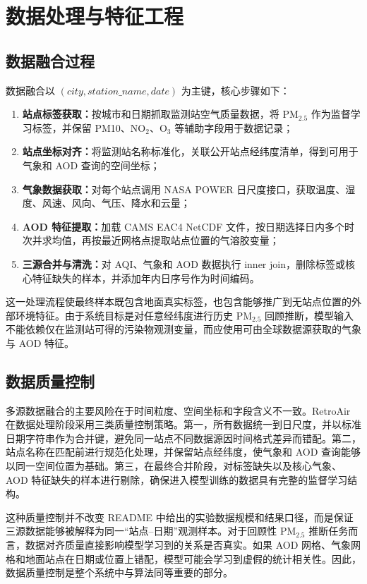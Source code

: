 \documentclass[UTF8,zihao=-4,a4paper]{ctexart}
\newcommand{\pmfine}{PM$_{2.5}$}
\newcommand{\aod}{AOD}
\begin{document}
\section{数据处理与特征工程}

\subsection{数据融合过程}

数据融合以 $(city, station\_name, date)$ 为主键，核心步骤如下：

\begin{enumerate}
  \item \textbf{站点标签获取：}按城市和日期抓取监测站空气质量数据，将 \pmfine{} 作为监督学习标签，并保留 PM10、NO$_2$、O$_3$ 等辅助字段用于数据记录；
  \item \textbf{站点坐标对齐：}将监测站名称标准化，关联公开站点经纬度清单，得到可用于气象和 \aod{} 查询的空间坐标；
  \item \textbf{气象数据获取：}对每个站点调用 NASA POWER 日尺度接口，获取温度、湿度、风速、风向、气压、降水和云量；
  \item \textbf{\aod{} 特征提取：}加载 CAMS EAC4 NetCDF 文件，按日期选择日内多个时次并求均值，再按最近网格点提取站点位置的气溶胶变量；
  \item \textbf{三源合并与清洗：}对 AQI、气象和 \aod{} 数据执行 inner join，删除标签或核心特征缺失的样本，并添加年内日序号作为时间编码。
\end{enumerate}

这一处理流程使最终样本既包含地面真实标签，也包含能够推广到无站点位置的外部环境特征。由于系统目标是对任意经纬度进行历史 \pmfine{} 回顾推断，模型输入不能依赖仅在监测站可得的污染物观测变量，而应使用可由全球数据源获取的气象与 \aod{} 特征。

\subsection{数据质量控制}

多源数据融合的主要风险在于时间粒度、空间坐标和字段含义不一致。RetroAir 在数据处理阶段采用三类质量控制策略。第一，所有数据统一到日尺度，并以标准日期字符串作为合并键，避免同一站点不同数据源因时间格式差异而错配。第二，站点名称在匹配前进行规范化处理，并保留站点经纬度，使气象和 \aod{} 查询能够以同一空间位置为基础。第三，在最终合并阶段，对标签缺失以及核心气象、\aod{} 特征缺失的样本进行剔除，确保进入模型训练的数据具有完整的监督学习结构。

这种质量控制并不改变 README 中给出的实验数据规模和结果口径，而是保证三源数据能够被解释为同一“站点--日期”观测样本。对于回顾性 \pmfine{} 推断任务而言，数据对齐质量直接影响模型学习到的关系是否真实。如果 \aod{} 网格、气象网格和地面站点在日期或位置上错配，模型可能会学习到虚假的统计相关性。因此，数据质量控制是整个系统中与算法同等重要的部分。
\end{document}

